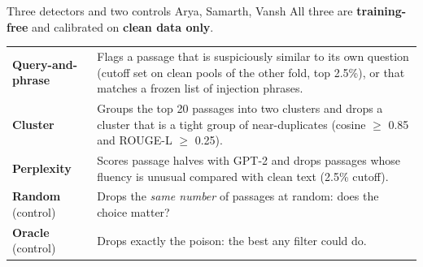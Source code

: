 \documentclass[aspectratio=169,11pt]{beamer}
\newcommand{\who}[1]{\hfill{\normalsize\color{muted}\textmd{#1}}}
\begin{document}
\begin{frame}[t]{Three detectors and two controls \who{Arya, Samarth, Vansh}}
\small
All three are \textbf{training-free} and calibrated on \textbf{clean data only}.
\vspace{0.15cm}

\begin{tabular}{@{}p{3.1cm}p{10.5cm}@{}}
\toprule
\textbf{Query-and-phrase} & Flags a passage that is suspiciously similar to its own question (cutoff set on clean pools of the other fold, top 2.5\%), or that matches a frozen list of injection phrases. \\
\textbf{Cluster} & Groups the top 20 passages into two clusters and drops a cluster that is a tight group of near-duplicates (cosine $\ge$ 0.85 and ROUGE-L $\ge$ 0.25). \\
\textbf{Perplexity} & Scores passage halves with GPT-2 and drops passages whose fluency is unusual compared with clean text (2.5\% cutoff). \\
\midrule
\textbf{Random} (control) & Drops the \emph{same number} of passages at random: does the choice matter? \\
\textbf{Oracle} (control) & Drops exactly the poison: the best any filter could do. \\
\bottomrule
\end{tabular}
\end{frame}
\end{document}
